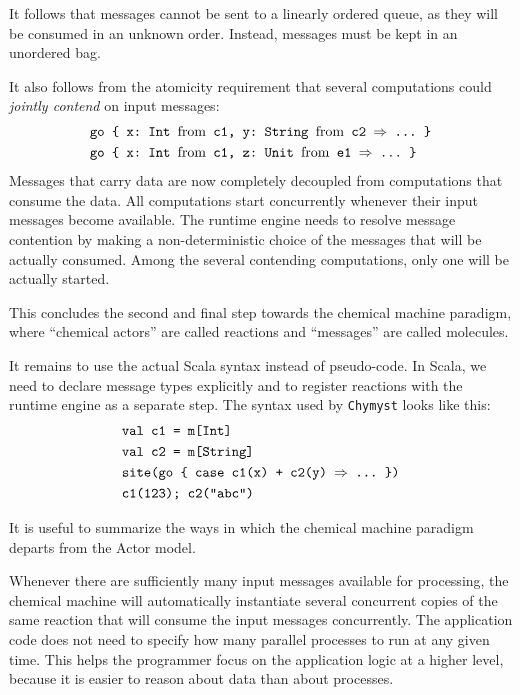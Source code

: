 \documentclass[sigplan,10pt,review,anonymous]{acmart}\settopmatter{printfolios=true}
\begin{document}
It follows that messages cannot be sent to a linearly ordered queue,
as they will be consumed in an unknown order.
Instead, messages must be kept in an unordered bag.

It also follows from the atomicity requirement that
several computations could \emph{jointly contend} on input messages:
\begin{align*}
\text{} & \text{\texttt{go \{ x:~Int \textnormal{from} c1, y:~String \textnormal{from} c2 \ensuremath{\Rightarrow} ...~\}}}\\
 & \text{\texttt{go \{ x:~Int \textnormal{from} c1, z:~Unit \textnormal{from} e1 \ensuremath{\Rightarrow} ...~\}}}
\end{align*}
Messages that carry data are now completely decoupled from computations
that consume the data. All computations start concurrently whenever
their input messages become available. The runtime engine needs to
resolve message contention by making a non-deterministic choice of
the messages that will be actually consumed. Among the several contending
computations, only one will be actually started.

This concludes the second and final step towards the chemical machine
paradigm, where ``chemical actors'' are called reactions and ``messages'' are called molecules.

It remains to use the actual Scala syntax instead of pseudo-code.
In Scala, we need to declare message types explicitly and to register
reactions with the runtime engine as a separate step.
The syntax used by \texttt{Chymyst} looks like this:
\begin{align*}
\text{} & \text{\texttt{val c1 = m[Int]}}\\
 & \text{\texttt{val c2 = m[String]}}\\
 & \text{\texttt{site(go \{ case c1(x) + c2(y) \ensuremath{\Rightarrow} ...~\})}}\\
 & \text{\texttt{c1(123); }\texttt{c2("abc")}}
\end{align*}

It is useful to summarize the ways in which the chemical machine paradigm departs
from the Actor model.

Whenever there are sufficiently many input messages available for
processing, the chemical machine will automatically instantiate several
concurrent copies of the same reaction that will consume the input
messages concurrently. The application code
does not need to specify how many parallel processes to run at any
given time.
This helps the programmer focus on the application logic at a higher level,
because it is easier to reason about data than about processes.
\end{document}

